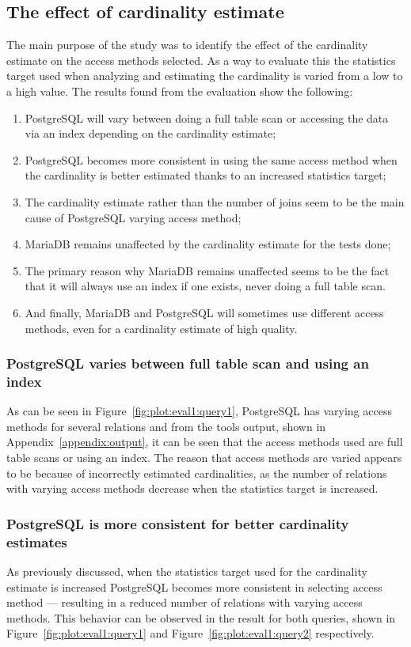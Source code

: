 \subsection{The effect of cardinality estimate}
The main purpose of the study was to identify the effect of the cardinality
estimate on the access methods selected. As a way to evaluate this the statistics
target used when analyzing and estimating the cardinality is varied from a low
to a high value. The results found from the evaluation show the following:
\begin{enumerate}
\item PostgreSQL will vary between doing a full table scan or accessing the data
  via an index depending on the cardinality estimate;
\item PostgreSQL becomes more consistent in using the same access method when
  the cardinality is better estimated thanks to an increased statistics target;
\item The cardinality estimate rather than the number of joins seem to be the
  main cause of PostgreSQL varying access method;
\item MariaDB remains unaffected by the cardinality estimate for the tests done;
\item The primary reason why MariaDB remains unaffected seems to be the fact
  that it will always use an index if one exists, never doing a full table scan.
\item And finally, MariaDB and PostgreSQL will sometimes use different access
  methods, even for a cardinality estimate of high quality.
\end{enumerate}

\subsubsection{PostgreSQL varies between full table scan and using an index}
As can be seen in Figure~\ref{fig:plot:eval1:query1}, PostgreSQL has varying
access methods for several relations and from the tools output, shown in
Appendix~\ref{appendix:output}, it can be seen that the access methods used are
full table scans or using an index. The reason that access methods are varied
appears to be because of incorrectly estimated cardinalities, as the number of
relations with varying access methods decrease when the statistics target is
increased.

\subsubsection{PostgreSQL is more consistent for better cardinality estimates}
As previously discussed, when the statistics target used for the cardinality
estimate is increased PostgreSQL becomes more consistent in selecting access
method --- resulting in a reduced number of relations with varying access
methods. This behavior can be observed in the result for both queries, shown in
Figure~\ref{fig:plot:eval1:query1} and Figure~\ref{fig:plot:eval1:query2}
respectively.

